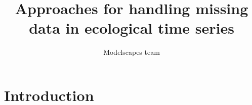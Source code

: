 \documentclass{article}
\title{Approaches for handling missing data in ecological time series}
\author{Modelscapes team\\
}
\begin{document}
\maketitle


\section*{Introduction} 


 
\end{document}
